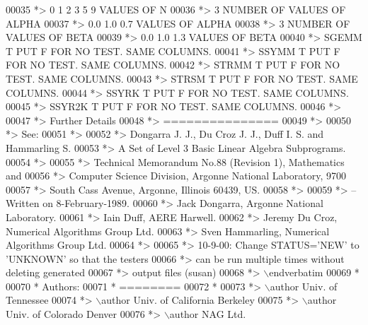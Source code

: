 \begin{DoxyCode}
00035 \textcolor{comment}{*> 0 1 2 3 5 9       VALUES OF N}
00036 \textcolor{comment}{*> 3                 NUMBER OF VALUES OF ALPHA}
00037 \textcolor{comment}{*> 0.0 1.0 0.7       VALUES OF ALPHA}
00038 \textcolor{comment}{*> 3                 NUMBER OF VALUES OF BETA}
00039 \textcolor{comment}{*> 0.0 1.0 1.3       VALUES OF BETA}
00040 \textcolor{comment}{*> SGEMM  T PUT F FOR NO TEST. SAME COLUMNS.}
00041 \textcolor{comment}{*> SSYMM  T PUT F FOR NO TEST. SAME COLUMNS.}
00042 \textcolor{comment}{*> STRMM  T PUT F FOR NO TEST. SAME COLUMNS.}
00043 \textcolor{comment}{*> STRSM  T PUT F FOR NO TEST. SAME COLUMNS.}
00044 \textcolor{comment}{*> SSYRK  T PUT F FOR NO TEST. SAME COLUMNS.}
00045 \textcolor{comment}{*> SSYR2K T PUT F FOR NO TEST. SAME COLUMNS.}
00046 \textcolor{comment}{*>}
00047 \textcolor{comment}{*> Further Details}
00048 \textcolor{comment}{*> ===============}
00049 \textcolor{comment}{*>}
00050 \textcolor{comment}{*> See:}
00051 \textcolor{comment}{*>}
00052 \textcolor{comment}{*>    Dongarra J. J., Du Croz J. J., Duff I. S. and Hammarling S.}
00053 \textcolor{comment}{*>    A Set of Level 3 Basic Linear Algebra Subprograms.}
00054 \textcolor{comment}{*>}
00055 \textcolor{comment}{*>    Technical Memorandum No.88 (Revision 1), Mathematics and}
00056 \textcolor{comment}{*>    Computer Science Division, Argonne National Laboratory, 9700}
00057 \textcolor{comment}{*>    South Cass Avenue, Argonne, Illinois 60439, US.}
00058 \textcolor{comment}{*>}
00059 \textcolor{comment}{*> -- Written on 8-February-1989.}
00060 \textcolor{comment}{*>    Jack Dongarra, Argonne National Laboratory.}
00061 \textcolor{comment}{*>    Iain Duff, AERE Harwell.}
00062 \textcolor{comment}{*>    Jeremy Du Croz, Numerical Algorithms Group Ltd.}
00063 \textcolor{comment}{*>    Sven Hammarling, Numerical Algorithms Group Ltd.}
00064 \textcolor{comment}{*>}
00065 \textcolor{comment}{*>    10-9-00:  Change STATUS='NEW' to 'UNKNOWN' so that the testers}
00066 \textcolor{comment}{*>              can be run multiple times without deleting generated}
00067 \textcolor{comment}{*>              output files (susan)}
00068 \textcolor{comment}{*> \(\backslash\)endverbatim}
00069 \textcolor{comment}{*}
00070 \textcolor{comment}{*  Authors:}
00071 \textcolor{comment}{*  ========}
00072 \textcolor{comment}{*}
00073 \textcolor{comment}{*> \(\backslash\)author Univ. of Tennessee }
00074 \textcolor{comment}{*> \(\backslash\)author Univ. of California Berkeley }
00075 \textcolor{comment}{*> \(\backslash\)author Univ. of Colorado Denver }
00076 \textcolor{comment}{*> \(\backslash\)author NAG Ltd. }

\end{DoxyCode}
